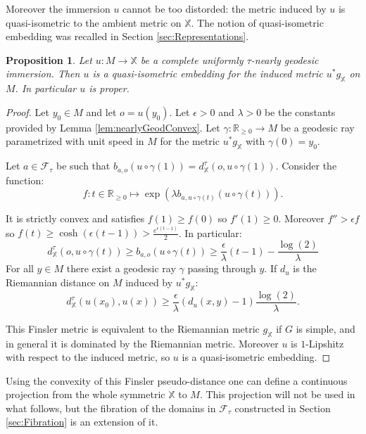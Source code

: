 \documentclass[reqno,10pt]{amsart}
\theoremstyle{plain}
\newtheorem{prop}[thm]{Proposition}
\theoremstyle{definition}
\theoremstyle{remark}
\newcommand{\type}{\tau}
\newcommand{\R}{\mathbb{R}}
\newcommand{\X}{\mathbb{X}}
\begin{document}
Moreover the immersion $u$ cannot be too distorded: the metric induced by $u$ is quasi-isometric to the ambient metric on $\X$. The notion of quasi-isometric embedding was recalled in Section \ref{sec:Representations}.

\begin{prop}
\label{prop:QuasiGeod}
Let  $u:M\to \X$ be a complete uniformly $\type$-nearly geodesic immersion. Then $u$ is a quasi-isometric embedding for the induced metric $u^*g_\X$ on $M$. In particular $u$ is proper.
\end{prop}

\begin{proof}

Let $y_0\in M$ and let $o=u(y_0)$. Let $\epsilon>0$ and $\lambda>0$ be the constants provided by Lemma \ref{lem:nearlyGeodConvex}. Let $\gamma:\R_{\geq 0}\to M$ be a geodesic ray parametrized with unit speed in $M$ for the metric $u^*g_\X$ with $\gamma(0)=y_0$.

\medskip

 Let $a\in \mathcal{F}_\type$ be such that $b_{a,o}\left(u\circ\gamma(1)\right)=d_\X^\type\left(o,u\circ\gamma(1)\right)$. Consider the function:
 $$f:t\in \R_{\geq 0}\mapsto \exp\left(\lambda b_{a,u\circ \gamma(t)}\left(u\circ \gamma(t)\right)\right).$$

It is strictly convex and satisfies $f(1)\geq f(0)$ so $f'(1)\geq 0$. Moreover $f''>\epsilon f$ so $f(t)\geq\cosh\left(\epsilon(t-1)\right)> \frac{e^{\epsilon(t-1)}}{2}$. In particular:
$$d_\X^\type\left(o,u\circ\gamma(t)\right)\geq b_{a,o}\left(u\circ\gamma(t)\right)\geq \frac{\epsilon}{\lambda}(t-1)-\frac{\log(2)}{\lambda}$$
For all $y\in M$ there exist a geodesic ray $\gamma$ passing through $y$. If $d_{u}$ is the Riemannian distance on $M$ induced by $u^*g_\X$:
$$d_\X^\type\left(u(x_0),u(x)\right)\geq \frac{\epsilon}{\lambda}(d_u\left(x,y\right)-1) \frac{\log(2)}{\lambda}.$$

This Finsler metric is equivalent to the Riemannian metric $g_\X$ if $G$ is simple, and in general it is dominated by the Riemannian metric. Moreover $u$ is $1$-Lipshitz with respect to the induced metric, so $u$ is a quasi-isometric embedding.

\end{proof}

Using the convexity of this Finsler pseudo-distance one can define a continuous projection from the whole symmetric $\X$ to $M$.  This projection will not be used in what follows, but the fibration of the domains in $\mathcal{F}_\type$ constructed in Section \ref{sec:Fibration} is an extension of it. 
\end{document}
